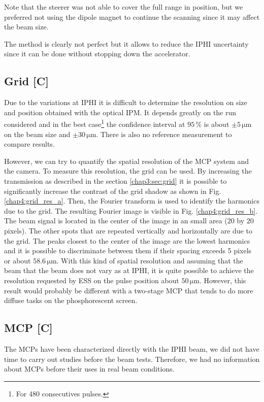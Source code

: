 \begin{refsection}
  

  Note that the steerer was not able to cover the full range in position, but we preferred not using the dipole magnet to continue the scanning since it may affect the beam size.

  The method is clearly not perfect but it allows to reduce the IPHI uncertainty since it can be done without stopping down the accelerator.

  \subsection{Grid [C]}

  Due to the variations at IPHI it is difficult to determine the resolution on size and position obtained with the optical IPM. It depends greatly on the run considered and in the best case\footnote{For 480 consecutives pulses.} the confidence interval at $95\,\mathrm{\%}$ is about $\pm 5\,\mathrm{\mu m}$ on the beam size and  $\pm 30\,\mathrm{\mu m}$. There is also no reference measurement to compare results.

  However, we can try to quantify the spatial resolution of the MCP system and the camera.
  To measure this resolution, the grid can be used. By increasing the transmission as described in the section \ref{chap3:sec:grid} it is possible to significantly increase the contrast of the grid shadow as shown in Fig. \ref{chap4:grid_res_a}. Then, the Fourier transform is used to identify the harmonics due to the grid. The resulting Fourier image is visible in Fig. \ref{chap4:grid_res_b}. The beam signal is located in the center of the image in an small area ($20$ by $20$ pixels). The other spots that are repeated vertically and horizontally are due to the grid. The peaks closest to the center of the image are the lowest harmonics and it is possible to discriminate between them if their spacing exceeds 5 pixels or about $58.6\,\mathrm{\mu m}$. With this kind of spatial resolution and assuming that the beam that the beam does not vary as at IPHI, it is quite possible to achieve the resolution requested by ESS on the pulse position about $50\,\mathrm{\mu m}$. However, this result would probably be different with a two-stage MCP that tends to do more diffuse tasks on the phosphorescent screen.

  

  \subsection{MCP [C]}
  The MCPs have been characterized directly with the IPHI beam, we did not have time to carry out studies before the beam tests. Therefore, we had no information about MCPs before their uses in real beam conditions.


\end{refsection}
